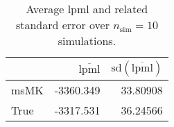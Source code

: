 \begin{table}[H]

\caption{Average lpml and related standard error over $n_{\text{sim}} = 10$ simulations.}
\centering
\begin{tabular}[t]{lrr}
\toprule
  & $\overbar{\text{lpml}}$ & $\text{sd}(\overbar{\text{lpml}})$\\
\midrule
msMK & -3360.349 & 33.80908\\
True & -3317.531 & 36.24566\\
\bottomrule
\end{tabular}
\end{table}